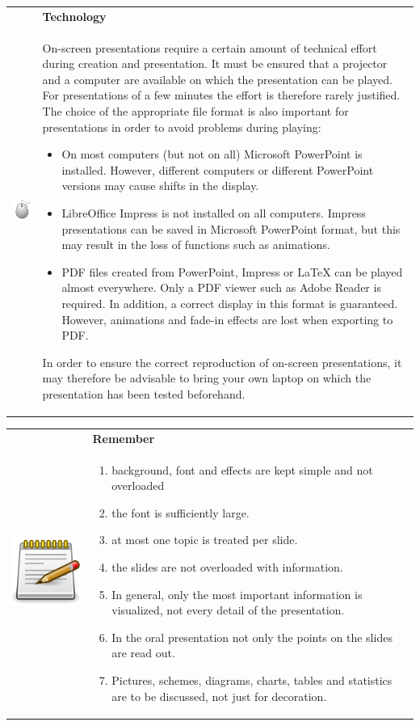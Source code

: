 \documentclass[
  english,
]{scrreprt}
\providecommand{\tightlist}{%
  \setlength{\itemsep}{0pt}\setlength{\parskip}{0pt}}
\newlength{\iconwidth}
\newenvironment{displaybox}[2]{%
    \begin{center}
        \setlength\arrayrulewidth{0.75pt}%
        \arrayrulecolor{white}%
        \renewcommand{\arraystretch}{1.3}%
        \begin{tabular}{p{\iconwidth}p{\linewidth-4\tabcolsep-\iconwidth}}
            \multirow{2}{*}{#2}&\cellcolor{boxheadcol}\textbf{\sffamily\color{white}#1} \\%
            \hhline{~-}%
            &\cellcolor{boxcol}%
}{%
            \\
        \end{tabular}
        \arrayrulecolor{black}
    \end{center}
}
\newenvironment{Technology}{%
\begin{displaybox}{Technology}{\includegraphics[width=\iconwidth]{images/icon-technik}}}%
{\end{displaybox}}
\newenvironment{Remember}{%
\begin{displaybox}{Remember}{\includegraphics[width=\iconwidth]{images/icon-merke}}}%
{\end{displaybox}}
\begin{document}
\begin{Technology}

On-screen presentations require a certain amount of technical effort during creation and presentation. It must be ensured that a projector and a computer are available on which the presentation can be played. For presentations of a few minutes the effort is therefore rarely justified. The choice of the appropriate file format is also important for presentations in order to avoid problems during playing:

\begin{itemize}
\item
  On most computers (but not on all) Microsoft PowerPoint is installed. However, different computers or different PowerPoint versions may cause shifts in the display.
\item
  LibreOffice Impress is not installed on all computers. Impress presentations can be saved in Microsoft PowerPoint format, but this may result in the loss of functions such as animations.
\item
  PDF files created from PowerPoint, Impress or LaTeX can be played almost everywhere. Only a PDF viewer such as Adobe Reader is required. In addition, a correct display in this format is guaranteed. However, animations and fade-in effects are lost when exporting to PDF.
\end{itemize}

In order to ensure the correct reproduction of on-screen presentations, it may therefore be advisable to bring your own laptop on which the presentation has been tested beforehand.

\end{Technology}

\begin{Remember}

\begin{enumerate}
\def\labelenumi{\arabic{enumi}.}
\tightlist
\item
  background, font and effects are kept simple and not overloaded
\item
  the font is sufficiently large.
\item
  at most one topic is treated per slide.
\item
  the slides are not overloaded with information.
\item
  In general, only the most important information is visualized, not every detail of the presentation.
\item
  In the oral presentation not only the points on the slides are read out.
\item
  Pictures, schemes, diagrams, charts, tables and statistics are to be discussed, not just for decoration.
\end{enumerate}

\end{Remember}
\end{document}
